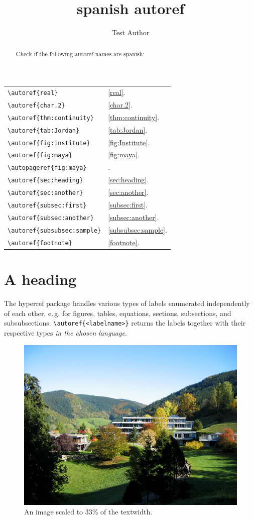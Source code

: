 \documentclass{snapshotmfo}
\author{Test Author}
\title{spanish autoref}
\begin{document}
\begin{abstract}
Check if the following autoref names are spanish:
\end{abstract}

\noindent\begin{tabular}{@{}l@{\quad yields\quad}l@{}}
\verb+\autoref{real}+             &\autoref{real}.\\
\verb+\autoref{char.2}+           &\autoref{char.2}.\\
\verb+\autoref{thm:continuity}+   &\autoref{thm:continuity}.\\
\verb+\autoref{tab:Jordan}+       &\autoref{tab:Jordan}.\\
\verb+\autoref{fig:Institute}+    &\autoref{fig:Institute}.\\
\verb+\autoref{fig:maya}+         &\autoref{fig:maya}.\\
\verb+\autopageref{fig:maya}+     &\autopageref{fig:maya}.\\
\verb+\autoref{sec:heading}+      &\autoref{sec:heading}.\\
\verb+\autoref{sec:another}+      &\autoref{sec:another}.\\
\verb+\autoref{subsec:first}+     &\autoref{subsec:first}.\\
\verb+\autoref{subsec:another}+   &\autoref{subsec:another}.\\
\verb+\autoref{subsubsec:sample}+ &\autoref{subsubsec:sample}.\\
\verb+\autoref{footnote}+         &\autoref{footnote}.\\
\end{tabular}


\section{A heading}
\label{sec:heading}
The hyperref package handles various types of labels enumerated independently of each other, e.\,g.
for figures, tables, equations, sections, subsections, and subsubsections.
\verb+\autoref{<labelname>}+ returns the labels together with their respective types {\em in the chosen language}.

\begin{figure}[ht]
        \centering
        \includegraphics[width= 0.33 \textwidth]{mfo.jpg}
        \caption{An image scaled to 33\% of the textwidth.}
\label{fig:Institute}
\end{figure}
\end{document}
